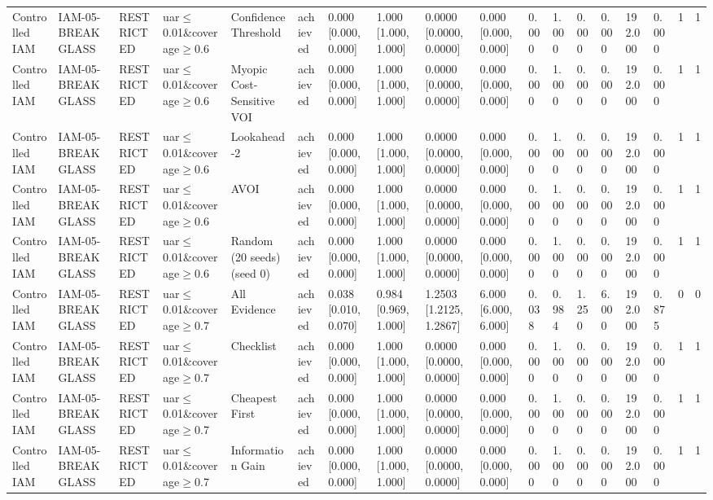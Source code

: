 \begin{table}[!ht]
{\begin{tabular}{llllllllllllllllll}
Controlled IAM & IAM-05-BREAKGLASS & RESTRICTED & uar$\le$0.01\&coverage$\ge$0.6 & Confidence Threshold & achieved & 0.000 [0.000, 0.000] & 1.000 [1.000, 1.000] & 0.0000 [0.0000, 0.0000] & 0.000 [0.000, 0.000] & 0.000 & 1.000 & 0.000 & 0.000 & 192.000 & 0.000 & 1 & 1 \\
Controlled IAM & IAM-05-BREAKGLASS & RESTRICTED & uar$\le$0.01\&coverage$\ge$0.6 & Myopic Cost-Sensitive VOI & achieved & 0.000 [0.000, 0.000] & 1.000 [1.000, 1.000] & 0.0000 [0.0000, 0.0000] & 0.000 [0.000, 0.000] & 0.000 & 1.000 & 0.000 & 0.000 & 192.000 & 0.000 & 1 & 1 \\
Controlled IAM & IAM-05-BREAKGLASS & RESTRICTED & uar$\le$0.01\&coverage$\ge$0.6 & Lookahead-2 & achieved & 0.000 [0.000, 0.000] & 1.000 [1.000, 1.000] & 0.0000 [0.0000, 0.0000] & 0.000 [0.000, 0.000] & 0.000 & 1.000 & 0.000 & 0.000 & 192.000 & 0.000 & 1 & 1 \\
Controlled IAM & IAM-05-BREAKGLASS & RESTRICTED & uar$\le$0.01\&coverage$\ge$0.6 & AVOI & achieved & 0.000 [0.000, 0.000] & 1.000 [1.000, 1.000] & 0.0000 [0.0000, 0.0000] & 0.000 [0.000, 0.000] & 0.000 & 1.000 & 0.000 & 0.000 & 192.000 & 0.000 & 1 & 1 \\
Controlled IAM & IAM-05-BREAKGLASS & RESTRICTED & uar$\le$0.01\&coverage$\ge$0.6 & Random (20 seeds) (seed 0) & achieved & 0.000 [0.000, 0.000] & 1.000 [1.000, 1.000] & 0.0000 [0.0000, 0.0000] & 0.000 [0.000, 0.000] & 0.000 & 1.000 & 0.000 & 0.000 & 192.000 & 0.000 & 1 & 1 \\
Controlled IAM & IAM-05-BREAKGLASS & RESTRICTED & uar$\le$0.01\&coverage$\ge$0.7 & All Evidence & achieved & 0.038 [0.010, 0.070] & 0.984 [0.969, 1.000] & 1.2503 [1.2125, 1.2867] & 6.000 [6.000, 6.000] & 0.038 & 0.984 & 1.250 & 6.000 & 192.000 & 0.875 & 0 & 0 \\
Controlled IAM & IAM-05-BREAKGLASS & RESTRICTED & uar$\le$0.01\&coverage$\ge$0.7 & Checklist & achieved & 0.000 [0.000, 0.000] & 1.000 [1.000, 1.000] & 0.0000 [0.0000, 0.0000] & 0.000 [0.000, 0.000] & 0.000 & 1.000 & 0.000 & 0.000 & 192.000 & 0.000 & 1 & 1 \\
Controlled IAM & IAM-05-BREAKGLASS & RESTRICTED & uar$\le$0.01\&coverage$\ge$0.7 & Cheapest First & achieved & 0.000 [0.000, 0.000] & 1.000 [1.000, 1.000] & 0.0000 [0.0000, 0.0000] & 0.000 [0.000, 0.000] & 0.000 & 1.000 & 0.000 & 0.000 & 192.000 & 0.000 & 1 & 1 \\
Controlled IAM & IAM-05-BREAKGLASS & RESTRICTED & uar$\le$0.01\&coverage$\ge$0.7 & Information Gain & achieved & 0.000 [0.000, 0.000] & 1.000 [1.000, 1.000] & 0.0000 [0.0000, 0.0000] & 0.000 [0.000, 0.000] & 0.000 & 1.000 & 0.000 & 0.000 & 192.000 & 0.000 & 1 & 1 \\

\end{tabular}}
\end{table}
